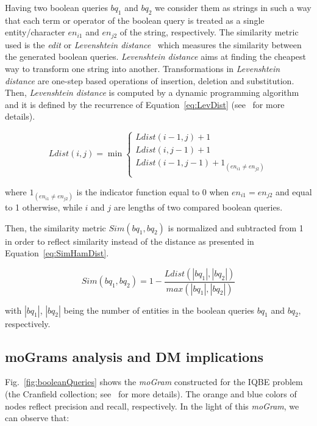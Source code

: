 \documentclass[journal]{IEEEtran}
\begin{document}
Having two boolean queries $bq_1$ and $bq_2$ we consider them as strings in such a way that each term or operator of the boolean query is treated as a single entity/character $en_{i1}$ and $en_{j2}$ of the string, respectively. The similarity metric used is the \emph{edit} or \emph{Levenshtein distance}~\cite{levenshtein66} which measures the similarity between the generated boolean queries. \emph{Levenshtein distance} aims at finding the cheapest way to transform one string into another. Transformations in \emph{Levenshtein distance} are one-step based operations of insertion, deletion and substitution.  Then, \emph{Levenshtein distance} is computed by a dynamic programming algorithm and it is defined by the recurrence of Equation~\ref{eq:LevDist} (see~\cite{Navarro01} for more details).



\begin{equation}
Ldist(i,j) = \min \begin{cases}
		Ldist(i-1,j)+1 \\
		Ldist(i,j-1)+1 \\
		Ldist(i-1,j-1)+1_{(en_{i1} \ne en_{j2})} \\
             \end{cases}
\end{equation}


\noindent where $1_{(en_{i1} \ne en_{j2})}$ is the indicator function equal to 0 when $en_{i1}= en_{j2}$ and equal to 1 otherwise, while $i$ and $j$ are lengths of two compared boolean queries.

Then, the similarity metric $Sim(bq_1,bq_2)$ is normalized and subtracted from 1 in order to reflect similarity instead of the distance as presented in Equation~\ref{eq:SimHamDist}.

\begin{equation}
\label{eq:LevDist}
  Sim(bq_1,bq_2) = 1 - \frac{Ldist(|bq_1|, |bq_2|)}{max(|bq_1|,|bq_2|)} 
\end{equation}

\noindent with $|bq_1|$, $|bq_2|$  being the number of entities in the boolean queries $bq_1$ and $bq_2$, respectively.


\subsection{moGrams analysis and DM implications}


Fig.~\ref{fig:booleanQueries} shows the \emph{moGram} constructed for the IQBE problem (the Cranfield collection; see~\cite{Cordon2006} for more details). The orange and blue colors of nodes reflect precision and recall, respectively. In the light of this \emph{moGram}, we can observe that:
\end{document}
